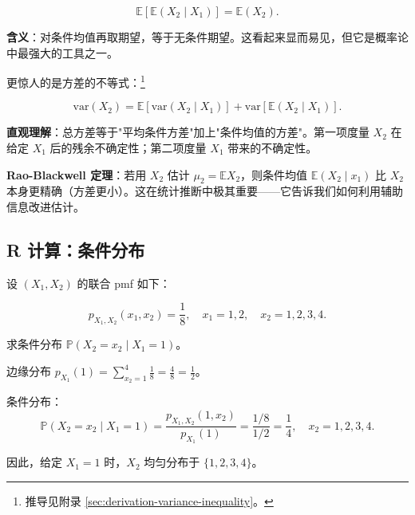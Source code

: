 \begin{theorem}[全期望公式]\label{th:law-total-expectation-ch2}
\begin{equation}\label{eq:law-total-expectation}
\mathbb{E}[\mathbb{E}(X_2 \mid X_1)] = \mathbb{E}(X_2).

\end{equation}
\end{theorem}

\textbf{含义}：对条件均值再取期望，等于无条件期望。这看起来显而易见，但它是概率论中最强大的工具之一。

更惊人的是方差的不等式：\footnote{推导见附录 \cref{sec:derivation-variance-inequality}。}

\begin{theorem}[条件方差公式]\label{th:law-total-variance-ch2}
\begin{equation}\label{eq:law-total-variance}
\text{var}(X_2) = \mathbb{E}[\text{var}(X_2 \mid X_1)] + \text{var}[\mathbb{E}(X_2 \mid X_1)].

\end{equation}
\end{theorem}

\textbf{直观理解}：总方差等于"平均条件方差"加上"条件均值的方差"。第一项度量 $X_2$ 在给定 $X_1$ 后的残余不确定性；第二项度量 $X_1$ 带来的不确定性。

\textbf{Rao-Blackwell 定理}：若用 $X_2$ 估计 $\mu_2 = \mathbb{E}X_2$，则条件均值 $\mathbb{E}(X_2 \mid x_1)$ 比 $X_2$ 本身更精确（方差更小）。这在统计推断中极其重要——它告诉我们如何利用辅助信息改进估计。

\subsection{R 计算：条件分布}

\begin{example}[离散条件分布]\label{ex:conditional-distribution-discrete-ch2}
设 $(X_1, X_2)$ 的联合 pmf 如下：

\[
p_{X_1, X_2}(x_1, x_2) = \frac{1}{8}, \quad x_1 = 1,2, \quad x_2 = 1,2,3,4.
\]

求条件分布 $\mathbb{P}(X_2 = x_2 \mid X_1 = 1)$。

边缘分布 $p_{X_1}(1) = \sum_{x_2=1}^4 \frac{1}{8} = \frac{4}{8} = \frac{1}{2}$。

条件分布：
\[
\mathbb{P}(X_2 = x_2 \mid X_1 = 1) = \frac{p_{X_1,X_2}(1,x_2)}{p_{X_1}(1)} = \frac{1/8}{1/2} = \frac{1}{4}, \quad x_2 = 1,2,3,4.
\]

因此，给定 $X_1 = 1$ 时，$X_2$ 均匀分布于 $\{1,2,3,4\}$。
\end{example}

